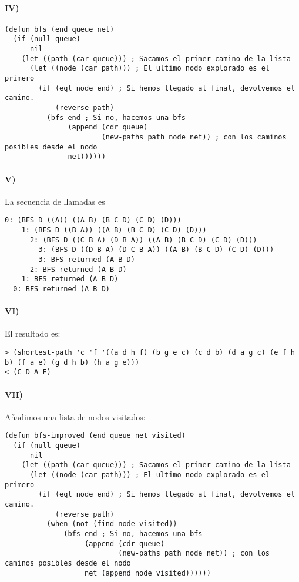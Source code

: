 \documentclass{aitemplate}
\begin{document}
\paragraph{IV)}

\begin{lstlisting}
(defun bfs (end queue net) 
  (if (null queue) 
      nil
    (let ((path (car queue))) ; Sacamos el primer camino de la lista
      (let ((node (car path))) ; El ultimo nodo explorado es el primero
        (if (eql node end) ; Si hemos llegado al final, devolvemos el camino.
            (reverse path)
          (bfs end ; Si no, hacemos una bfs
               (append (cdr queue)
                       (new-paths path node net)) ; con los caminos posibles desde el nodo
               net))))))
\end{lstlisting}

\paragraph{V)}

La secuencia de llamadas es

\begin{verbatim}
0: (BFS D ((A)) ((A B) (B C D) (C D) (D)))
    1: (BFS D ((B A)) ((A B) (B C D) (C D) (D)))
      2: (BFS D ((C B A) (D B A)) ((A B) (B C D) (C D) (D)))
        3: (BFS D ((D B A) (D C B A)) ((A B) (B C D) (C D) (D)))
        3: BFS returned (A B D)
      2: BFS returned (A B D)
    1: BFS returned (A B D)
  0: BFS returned (A B D)
\end{verbatim}

\paragraph{VI)}

El resultado es:

\begin{verbatim}
> (shortest-path 'c 'f '((a d h f) (b g e c) (c d b) (d a g c) (e f h b) (f a e) (g d h b) (h a g e)))
< (C D A F)
\end{verbatim}

\newpage
\paragraph{VII)}

Añadimos una lista de nodos visitados:

\begin{lstlisting}
(defun bfs-improved (end queue net visited) 
  (if (null queue) 
      nil
    (let ((path (car queue))) ; Sacamos el primer camino de la lista
      (let ((node (car path))) ; El ultimo nodo explorado es el primero
        (if (eql node end) ; Si hemos llegado al final, devolvemos el camino.
            (reverse path)
          (when (not (find node visited))
	          (bfs end ; Si no, hacemos una bfs
	               (append (cdr queue)
	                       (new-paths path node net)) ; con los caminos posibles desde el nodo
	               net (append node visited))))))
\end{lstlisting}
\end{document}
